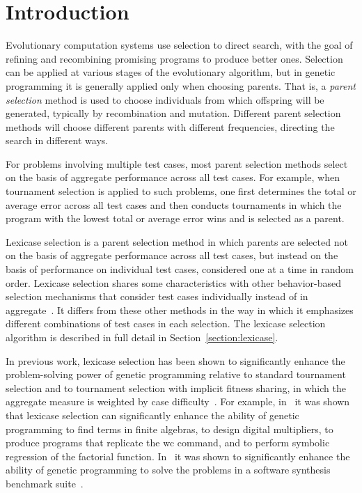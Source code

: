 \documentclass{sig-alternate}
\begin{document}
%
%

%
%
\printccsdesc



\section{Introduction}
\label{section:introduction}

Evolutionary computation systems use selection to direct search, with the goal of refining and recombining promising programs to produce better ones. Selection can be applied at various stages of the evolutionary algorithm, but in genetic programming it is generally applied only when choosing parents. That is, a \emph{parent selection} method is used to choose individuals from which offspring will be generated, typically by recombination and mutation. Different parent selection methods will choose different parents with different frequencies, directing the search in different ways.

For problems involving multiple test cases, most parent selection methods select on the basis of aggregate performance across all test cases. For example, when tournament selection is applied to such problems, one first determines the total or average error across all test cases and then conducts tournaments in which the program with the lowest total or average error wins and is selected as a parent.

Lexicase selection is a parent selection method in which parents are selected not on the basis of aggregate performance across all test cases, but instead on the basis of performance on individual test cases, considered one at a time in random order. Lexicase selection shares some characteristics with other behavior-based selection mechanisms that consider test cases individually instead of in aggregate~\cite{Krawiec:2015:GPTP, Krawiec:2015:GECCO:smgpWorkshop}. It differs from these other methods in the way in which it emphasizes different combinations of test cases in each selection. The lexicase selection algorithm is described in full detail in Section~\ref{section:lexicase}.

In previous work, lexicase selection has been shown to significantly enhance the problem-solving power of genetic programming relative to standard tournament selection and to tournament selection with implicit fitness sharing, in which the aggregate measure is weighted by case difficulty~\cite{McKay:2000:GECCO}. For example, in~\cite{Helmuth:2014:ieeeTEC} it was shown that lexicase selection can significantly enhance the ability of genetic programming to find terms in finite algebras, to design digital multipliers, to produce programs that replicate the {\ttfamily wc} command, and to perform symbolic regression of the factorial function. In~\cite{Helmuth:2015:dissertation} it was shown to significantly enhance the ability of genetic programming to solve the problems in a software synthesis benchmark suite~\cite{Helmuth:2015:GECCO}.
\end{document}
